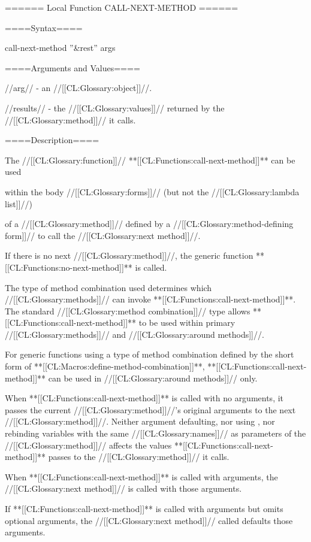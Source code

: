====== Local Function CALL-NEXT-METHOD ======

====Syntax====

\DefunWithValues call-next-method {''&rest'' args} {}

====Arguments and Values====

//arg// - an //[[CL:Glossary:object]]//.


//results// - the //[[CL:Glossary:values]]// returned by the //[[CL:Glossary:method]]// it calls.

====Description====

The //[[CL:Glossary:function]]// **[[CL:Functions:call-next-method]]** can be used

within the body //[[CL:Glossary:forms]]// (but not the //[[CL:Glossary:lambda list]]//)

of a //[[CL:Glossary:method]]// defined by a //[[CL:Glossary:method-defining form]]// to call the //[[CL:Glossary:next method]]//.

If there is no next //[[CL:Glossary:method]]//, the generic function **[[CL:Functions:no-next-method]]** is called.

The type of method combination used determines which //[[CL:Glossary:methods]]// can invoke **[[CL:Functions:call-next-method]]**. The standard //[[CL:Glossary:method combination]]// type allows **[[CL:Functions:call-next-method]]** to be used within primary //[[CL:Glossary:methods]]// and //[[CL:Glossary:around methods]]//.

For generic functions using a type of method combination defined by the short form of **[[CL:Macros:define-method-combination]]**, **[[CL:Functions:call-next-method]]** can be used in //[[CL:Glossary:around methods]]// only.

When **[[CL:Functions:call-next-method]]** is called with no arguments, it passes the current //[[CL:Glossary:method]]//'s original arguments to the next //[[CL:Glossary:method]]//. Neither argument defaulting, nor using , nor rebinding variables with the same //[[CL:Glossary:names]]// as parameters of the //[[CL:Glossary:method]]// affects the values **[[CL:Functions:call-next-method]]** passes to the //[[CL:Glossary:method]]// it calls.



When **[[CL:Functions:call-next-method]]** is called with arguments, the //[[CL:Glossary:next method]]// is called with those arguments.

If **[[CL:Functions:call-next-method]]** is called with arguments but omits optional arguments, the //[[CL:Glossary:next method]]// called defaults those arguments.


